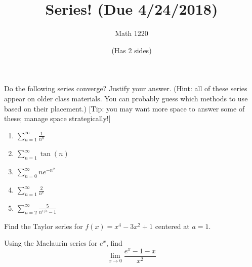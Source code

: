 \documentclass[12pt, a4paper]{article}
\author{Math 1220}
\title{Series! (Due 4/24/2018)}
\date{(Has 2 sides)}
\begin{document}
\maketitle
\nameline
\vspace{-0.5in}
\begin{ex}
  Do the following series converge? Justify your answer. (Hint: all of
  these series appear on older class materials. You can probably guess
  which methods to use based on their placement.) [Tip: you may want
  more space to answer some of these; manage space strategically!]
  \begin{enumerate}
  \item \(\sum_{n=1}^\infty \frac{1}{n^n}\)
    \vspace{1in}
  \item \(\sum_{n=1}^\infty \tan(n)\)
    \vspace{1in}
  \item \(\sum_{n=0}^\infty n e^{-n^2}\)
    \vspace{1in}
  \item \(\sum_{n=1}^\infty \frac{2}{n^e}\)
    \vspace{1in}
  \item \(\sum_{n=2}^\infty \frac{5}{n^{1/3}-1}\)
  \end{enumerate}
\end{ex}
\begin{ex}
  Find the Taylor series for \(f(x) = x^4-3x^2+1\) centered at \(a=1\).
\end{ex}
\vspace{1in}
\begin{ex}
  Using the Maclaurin series for \(e^x\), find \[
    \lim_{x \to 0} \frac{e^x-1-x}{x^2}
  \]
\end{ex}
\end{document}
